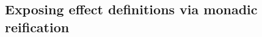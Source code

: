 \documentclass[sigplan,screen]{acmart}\settopmatter{}
\newcommand\fstar{F$^\star$\xspace}
\newcommand{\comm}[3]{\ifcheckpagebudget\else\ifdraft{\maybecolor{#1}[#2: #3]}\fi\fi}
\newcommand{\ch}[1]{\comm{teal}{CH}{#1}}
\begin{document}









\subsection{Exposing effect definitions via \iffull monadic \fi reification}
\label{sec:reification}
\end{document}
